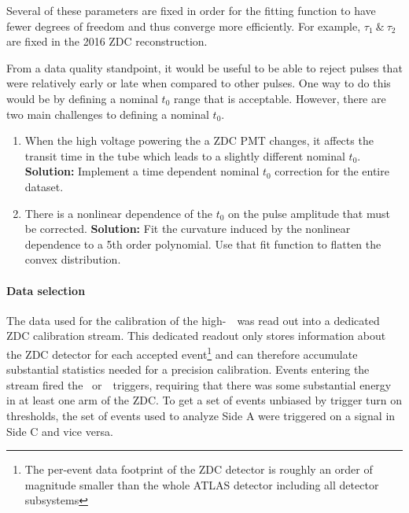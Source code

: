 Several of these parameters are fixed in order for the fitting function to have fewer degrees of freedom and thus converge more efficiently.  For example, $\tau_1\ \&\ \tau_2$ are fixed in the 2016 ZDC reconstruction.

From a data quality standpoint, it would be useful to be able to reject pulses that were relatively early or late when compared to other pulses. One way to do this would be by defining a nominal $t_0$ range that is acceptable.  However, there are two main challenges to defining a nominal $t_0$.
\begin{enumerate}
    \item When the high voltage powering the a ZDC PMT changes, it affects the transit time in the tube which leads to a slightly different nominal $t_0$. \newline \textbf{Solution:} Implement a time dependent nominal $t_0$ correction for the entire dataset.
    \item There is a nonlinear dependence of the $t_0$ on the pulse amplitude that must be corrected.  \newline \textbf{Solution:} Fit the curvature induced by the nonlinear dependence to a 5th order polynomial.  Use that fit function to flatten the convex distribution.
\end{enumerate}

\paragraph{Data selection}

The data used for the calibration of the high-\avmu\ \pxPb\ was read out into a dedicated ZDC calibration stream.  This dedicated readout only stores information about the ZDC detector for each accepted event\footnote{The per-event data footprint of the ZDC detector is roughly an order of magnitude smaller than the whole ATLAS detector including all detector subsystems} and can therefore accumulate substantial statistics needed for a precision calibration.  Events entering the stream fired the \triga~or~\trigc\ triggers, requiring that there was some substantial energy in at least one arm of the ZDC.  To get a set of events unbiased by trigger turn on thresholds, the set of events used to analyze Side A were triggered on a signal in Side C and vice versa.

